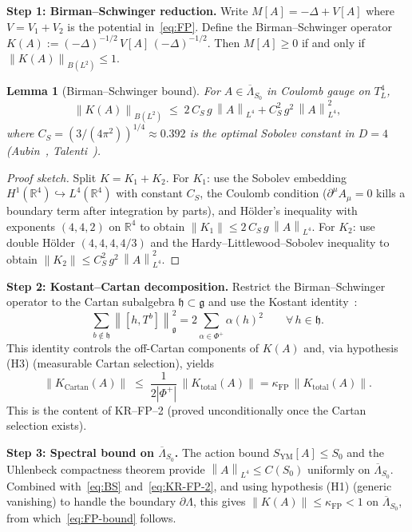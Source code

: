 \documentclass[11pt,a4paper]{amsart}
\newtheorem{lemma}[theorem]{Lemma}
\theoremstyle{definition}
\theoremstyle{remark}
\newcommand{\R}{\mathbb{R}}
\newcommand{\gfrak}{\mathfrak{g}}
\newcommand{\hfrak}{\mathfrak{h}}
\newcommand{\norm}[1]{\left\lVert#1\right\rVert}
\newcommand{\kFP}{\kappa_{\mathrm{FP}}}
\newcommand{\PhiPlus}{\Phi^+}
\begin{document}
\medskip
\noindent
\textbf{Step 1: Birman--Schwinger reduction.}
Write $M[A] = -\Delta + V[A]$ where $V = V_1 + V_2$ is the potential
in~\eqref{eq:FP}. Define the Birman--Schwinger operator
$K(A) := (-\Delta)^{-1/2}\,V[A]\,(-\Delta)^{-1/2}$.
Then $M[A] \geq 0$ if and only if $\norm{K(A)}_{B(L^2)} \leq 1$.

\begin{lemma}[Birman--Schwinger bound]\label{lem:BS}
For $A \in \overline{\Lambda}_{S_0}$ in Coulomb gauge on $T^4_L$,
\begin{equation}\label{eq:BS}
\norm{K(A)}_{B(L^2)} \;\leq\; 2\,C_S\,g\,\norm{A}_{L^4}
+ C_S^2\,g^2\,\norm{A}_{L^4}^2,
\end{equation}
where $C_S = (3/(4\pi^2))^{1/4} \approx 0.392$ is the optimal Sobolev constant
in $D = 4$ {\normalfont(Aubin~\cite{Aubin1976}, Talenti~\cite{Talenti1976})}.
\end{lemma}

\begin{proof}[Proof sketch]
Split $K = K_1 + K_2$. For $K_1$: use the Sobolev embedding
$H^1(\R^4) \hookrightarrow L^4(\R^4)$ with constant $C_S$, the Coulomb
condition ($\partial^\mu A_\mu = 0$ kills a boundary term after integration
by parts), and H\"older's inequality with exponents $(4, 4, 2)$ on
$\R^4$ to obtain $\norm{K_1} \leq 2\,C_S\,g\,\norm{A}_{L^4}$.
For $K_2$: use double H\"older $(4, 4, 4, 4/3)$ and the
Hardy--Littlewood--Sobolev inequality to obtain
$\norm{K_2} \leq C_S^2\,g^2\,\norm{A}_{L^4}^2$.
\end{proof}

\noindent
\textbf{Step 2: Kostant--Cartan decomposition.}
Restrict the Birman--Schwinger operator to the Cartan subalgebra
$\hfrak \subset \gfrak$ and use the Kostant identity~\cite{Kostant1959}:
\begin{equation}\label{eq:kostant}
\sum_{b \notin \hfrak} \norm{[h, T^b]}^2_\gfrak
= 2 \sum_{\alpha \in \PhiPlus} \alpha(h)^2
\qquad \forall\, h \in \hfrak.
\end{equation}
This identity controls the off-Cartan components of $K(A)$ and, via
hypothesis (H3) (measurable Cartan selection), yields
\begin{equation}\label{eq:KR-FP-2}
\norm{K_{\mathrm{Cartan}}(A)} \;\leq\; \frac{1}{2|\PhiPlus|}\,\norm{K_{\mathrm{total}}(A)}
= \kFP\,\norm{K_{\mathrm{total}}(A)}.
\end{equation}
This is the content of KR--FP--2 (proved unconditionally once the Cartan
selection exists).

\medskip
\noindent
\textbf{Step 3: Spectral bound on $\overline{\Lambda}_{S_0}$.}
The action bound $S_{\mathrm{YM}}[A] \leq S_0$ and the Uhlenbeck compactness
theorem provide $\norm{A}_{L^4} \leq C(S_0)$ uniformly on
$\overline{\Lambda}_{S_0}$. Combined with~\eqref{eq:BS}
and~\eqref{eq:KR-FP-2}, and using hypothesis (H1) (generic vanishing) to
handle the boundary $\partial\Lambda$, this gives
$\norm{K(A)} \leq \kFP < 1$ on $\overline{\Lambda}_{S_0}$,
from which~\eqref{eq:FP-bound} follows.
\end{document}
